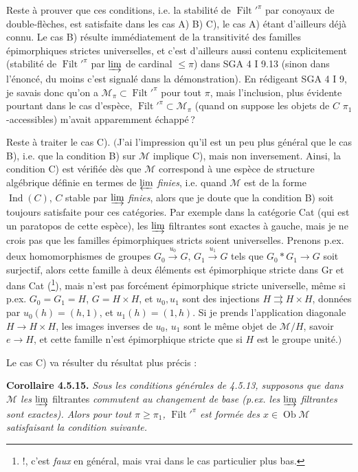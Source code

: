 \documentclass[11pt]{article}
\newcommand{\msp}[1]{\marginpar{\footnotesize [#1]}}
\newcommand{\Filt}{\operatorname{Filt}}
\newcommand{\Ob}{\operatorname{Ob}}
\newcommand{\Ind}{\operatorname{Ind}}
\begin{document}
Reste à prouver que ces conditions, i.e. la stabilité de $\Filt'^{\pi}$ par conoyaux de double-flèches, est satisfaite dans les cas A) B) C), le cas A) étant d'ailleurs déjà connu. Le cas B) résulte immédiatement de la transitivité des familles épimorphiques strictes universelles, et c'est d'ailleurs aussi contenu explicitement (stabilité de $\Filt'^{\pi}$ par $\varinjlim$ de cardinal $\leqslant \pi$) dans SGA 4 I 9.13 (sinon dans l'énoncé, du moins c'est signalé dans la démonstration). En rédigeant SGA 4 I 9, je savais donc qu'on a $\mathcal{M}_{\pi} \subset \Filt'^{\pi}$ pour tout $\pi$, mais l'inclusion, plus évidente pourtant dans le cas d'espèce, $\Filt'^{\pi} \subset \mathcal{M}_{\pi}$ (quand on suppose les objets de $C$ $\pi_1$-accessibles) m'avait apparemment échappé\,?

Reste à traiter le cas C). $\Big($J'ai l'impression qu'il est un peu plus général que le cas B), i.e. que la condition B) sur $\mathcal{M}$ implique C), mais non inversement. Ainsi, la condition C) est vérifiée dès que $\mathcal{M}$ correspond à une espèce de structure algébrique définie en
\msp{page 135}
termes de $\varprojlim$ \textit{finies}, i.e. quand $\mathcal{M}$ est de la forme $\Ind(C)$, $C$ stable par $\varinjlim$ \textit{finies}, alors que je doute que la condition B) soit toujours satisfaite pour ces catégories. Par exemple dans la catégorie Cat (qui est un paratopos de cette espèce), les $\varinjlim$ filtrantes sont exactes à gauche, mais je ne crois pas que les familles épimorphiques stricts soient universelles. %
Prenons p.ex. deux homomorphismes de groupes $G_0 \xrightarrow{u_0} G$, $G_1 \xrightarrow{u_1} G$ tels que $G_0 * G_1 \longrightarrow G$ soit surjectif, alors cette famille à deux éléments est épimorphique stricte dans Gr et dans Cat (\footnote{!, c'est \textit{faux} en général, mais vrai dans le cas particulier plus bas.}), mais n'est pas forcément épimorphique stricte universelle, même si p.ex. $G_0 = G_1 = H$, $G = H \times H$, et $u_0, u_1$ sont des injections $H \rightrightarrows H \times H$, données par $u_0(h) = (h,1)$, et $u_1(h) = (1,h)$. Si je prends l'application diagonale $H \longrightarrow H \times H$, les images inverses de $u_0$, $u_1$ sont le même objet de $\mathcal{M}/H$, savoir $e \longrightarrow H$, et cette famille n'est épimorphique stricte que si $H$ est le groupe unité.$\Big)$

Le cas C) va résulter du résultat plus précis :

\textbf{Corollaire 4.5.15.} \textit{Sous les conditions générales de 4.5.13, supposons que dans $\mathcal{M}$ les} $\varinjlim$
\msp{page 136}
filtrantes \textit{commutent au changement de base (p.ex. les} $\varinjlim$ \textit{filtrantes sont exactes). Alors pour tout $\pi \geqslant \pi_1$,} $\Filt'^{\pi}$ \textit{est formée des $x \in \Ob \mathcal{M}$ satisfaisant la condition suivante.}
\end{document}
